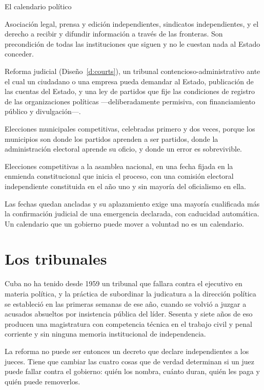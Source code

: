 \begin{design}{El calendario político}
\label{d:calendar}
\begin{rules}
 Asociación legal, prensa y edición independientes, sindicatos
independientes, y el derecho a recibir y difundir información a través de las
fronteras. Son precondición de todas las instituciones que siguen y no le cuestan
nada al Estado conceder.

 Reforma judicial (Diseño~\ref{d:courts}), un tribunal
contencioso-administrativo ante el cual un ciudadano o una empresa pueda demandar al
Estado, publicación de las cuentas del Estado, y una ley de partidos que fije las
condiciones de registro de las organizaciones políticas ---deliberadamente permisiva,
con financiamiento público y divulgación---.

 Elecciones municipales competitivas, celebradas primero y dos
veces, porque los municipios son donde los partidos aprenden a ser partidos, donde la
administración electoral aprende su oficio, y donde un error es sobrevivible.

 Elecciones competitivas a la asamblea nacional, en una fecha fijada
en la enmienda constitucional que inicia el proceso, con una comisión electoral
independiente constituida en el año uno y sin mayoría del oficialismo en ella.

 Las fechas quedan ancladas y su aplazamiento exige una
mayoría cualificada más la confirmación judicial de una emergencia declarada, con
caducidad automática. Un calendario que un gobierno puede mover a voluntad no es un
calendario.
\end{rules}
\end{design}

\section{Los tribunales}

Cuba no ha tenido desde 1959 un tribunal que fallara contra el ejecutivo en materia
política, y la práctica de subordinar la judicatura a la dirección política se
estableció en las primeras semanas de ese año, cuando se volvió a juzgar a acusados
absueltos por insistencia pública del líder. Sesenta y siete años de eso producen
una magistratura con competencia técnica en el trabajo civil y penal corriente y sin
ninguna memoria institucional de independencia.

La reforma no puede ser entonces un decreto que declare independientes a los jueces.
Tiene que cambiar las cuatro cosas que de verdad determinan si un juez puede fallar
contra el gobierno: quién los nombra, cuánto duran, quién les paga y quién puede
removerlos.

